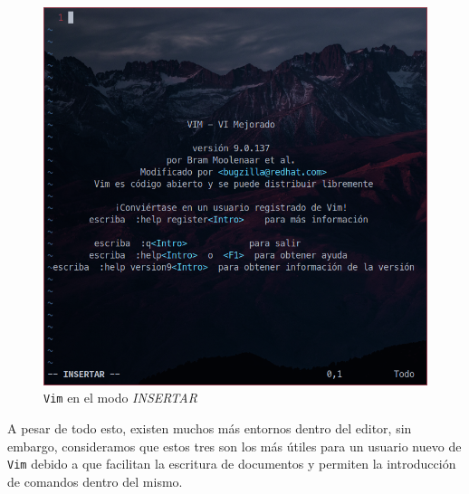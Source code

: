 \documentclass[10pt]{article}
\begin{document}
\begin{figure}[h]
	\centering
	\includegraphics[scale=0.6]{./img/Vim_INS.png}
	\caption{\texttt{Vim} en el modo \textit{INSERTAR}}
\end{figure}
\newline
A pesar de todo esto, existen muchos más entornos dentro del editor, sin embargo, consideramos que estos tres son los más útiles para un usuario nuevo de \texttt{Vim} debido a que facilitan la escritura de documentos y permiten la introducción de comandos dentro del mismo. 
\newpage
\end{document}
